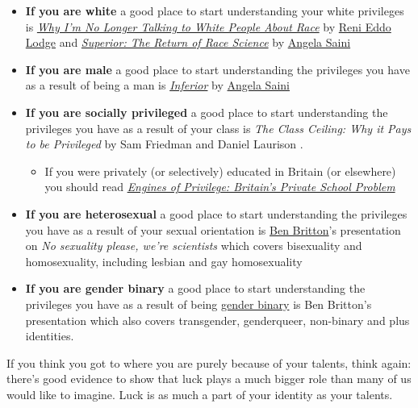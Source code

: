 \documentclass[
]{book}
\providecommand{\tightlist}{%
  \setlength{\itemsep}{0pt}\setlength{\parskip}{0pt}}
\begin{document}
\begin{itemize}
\tightlist
\item
  \textbf{If you are white} a good place to start understanding your white privileges is \emph{\href{https://en.wikipedia.org/wiki/Why_I'm_No_Longer_Talking_to_White_People_About_Race}{Why I'm No Longer Talking to White People About Race}} by \href{https://en.wikipedia.org/wiki/Reni_Eddo-Lodge}{Reni Eddo Lodge} \citep{nottalking} and \emph{\href{https://en.wikipedia.org/wiki/Superior:_The_Return_of_Race_Science}{Superior: The Return of Race Science}} by \href{https://en.wikipedia.org/wiki/Angela_Saini}{Angela Saini}
\item
  \textbf{If you are male} a good place to start understanding the privileges you have as a result of being a man is \emph{\href{https://en.wikipedia.org/wiki/Inferior_(book)}{Inferior}} by \href{https://en.wikipedia.org/wiki/Angela_Saini}{Angela Saini} \citep{inferior}
\item
  \textbf{If you are socially privileged} a good place to start understanding the privileges you have as a result of your class is \emph{The Class Ceiling: Why it Pays to be Privileged} by Sam Friedman and Daniel Laurison \citep{classceiling}.

  \begin{itemize}
  \tightlist
  \item
    If you were privately (or selectively) educated in Britain (or elsewhere) you should read \emph{\href{https://en.wikipedia.org/wiki/Engines_of_Privilege}{Engines of Privilege: Britain's Private School Problem}} \citep{nicebutdim}
  \end{itemize}
\item
  \textbf{If you are heterosexual} a good place to start understanding the privileges you have as a result of your sexual orientation is \href{https://en.wikipedia.org/wiki/Ben_Britton}{Ben Britton}'s presentation on \emph{No sexuality please, we're scientists} \citep{nosex} which covers bisexuality and homosexuality, including lesbian and gay homosexuality
\item
  \textbf{If you are gender binary} a good place to start understanding the privileges you have as a result of being \href{https://en.wikipedia.org/wiki/Gender_binary}{gender binary} is Ben Britton's presentation \citep{nosex} which also covers transgender, genderqueer, non-binary and plus identities.
\end{itemize}

If you think you got to where you are purely because of your talents, think again: there's good evidence to show that luck plays a much bigger role than many of us would like to imagine. \citep{luckynottalented} Luck is as much a part of your identity as your talents.
\end{document}
